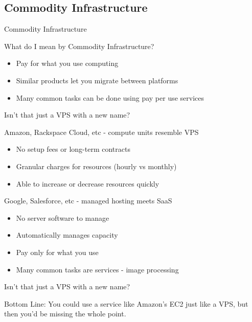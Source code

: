 \documentclass{beamer}
\begin{document}
\subsection{Commodity Infrastructure}
\begin{frame}{Commodity Infrastructure}
  \begin{block}{What do I mean by Commodity Infrastructure?}
    \begin{itemize}
    \item Pay for what you use computing
    \item Similar products let you migrate between platforms
    \item Many common tasks can be done using pay per use services
    \end{itemize}
  \end{block}
\end{frame}
\begin{frame}{Isn't that just a VPS with a new name?}
\pause
\begin{block}{Amazon, Rackspace Cloud, etc - compute units resemble VPS}
  \begin{itemize}
  \item No setup fees or long-term contracts
  \item Granular charges for resources (hourly vs monthly)
  \item Able to increase or decrease resources quickly
  \end{itemize}
\end{block}
\pause
\begin{block}{Google, Salesforce, etc - managed hosting meets SaaS}
  \begin{itemize}
  \item No server software to manage
  \item Automatically manages capacity
  \item Pay only for what you use
  \item Many common tasks are services - image processing
  \end{itemize}
\end{block}
\end{frame}

\begin{frame}{Isn't that just a VPS with a new name?}
  \begin{block}{Bottom Line:}
    You could use a service like Amazon's EC2 just like a VPS, but then you'd be missing the whole point.
  \end{block}
\end{frame}
\end{document}
